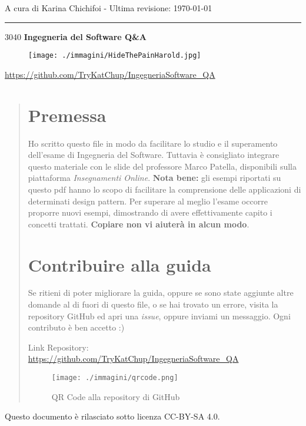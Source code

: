 \documentclass{article}
\makeatletter
\newcommand\HUGE{\@setfontsize\Huge{30}{40}}
\makeatother
\begin{document}
\begin{titlepage}
	\centering
	\large
	A cura di Karina Chichifoi - Ultima revisione: \today

	\noindent\rule{15cm}{0.2pt}

	\vspace{1.5cm}

	\HUGE
	\textbf{Ingegneria del Software Q\&A}

	\vspace{2cm}
	\begin{figure}[htb!]
		\centering
		\texttt{[image: ./immagini/HideThePainHarold.jpg]}
	\end{figure}
	\normalsize
	\url{https://github.com/TryKatChup/IngegneriaSoftware_QA}

	\clearpage
\end{titlepage}
\renewcommand{\abstractname}{}
\begin{abstract}
	\section*{Premessa}
	Ho scritto questo file in modo da facilitare lo studio e il superamento dell'esame di Ingegneria del Software.
	Tuttavia è consigliato integrare questo materiale con le slide del professore Marco Patella, disponibili sulla piattaforma \textit{Insegnamenti Online}.
    \newline\newline
    \textbf{Nota bene:}
    gli esempi riportati su questo pdf hanno lo scopo di facilitare la comprensione delle applicazioni di determinati design pattern.
    Per superare al meglio l'esame occorre proporre nuovi esempi, dimostrando di avere effettivamente capito i concetti trattati.
    \newline
    \textbf{Copiare non vi aiuterà in alcun modo}.
	\section*{Contribuire alla guida}

	Se ritieni di poter migliorare la guida, oppure se sono state aggiunte altre domande al di fuori di questo file, o se hai trovato un errore, visita la repository GitHub ed apri una \textit{issue}, oppure inviami un messaggio. Ogni contributo è ben accetto :)

	\vspace{4mm}
	Link Repository: \url{https://github.com/TryKatChup/IngegneriaSoftware_QA}

	\vspace{5mm}

	\begin{figure}[htb!]
		\centering
		\texttt{[image: ./immagini/qrcode.png]}
		\caption{QR Code alla repository di GitHub}
	\end{figure}
\end{abstract}



\newline
\newline
Questo documento è rilasciato sotto licenza CC-BY-SA 4.0. \ccbysa
\end{document}
